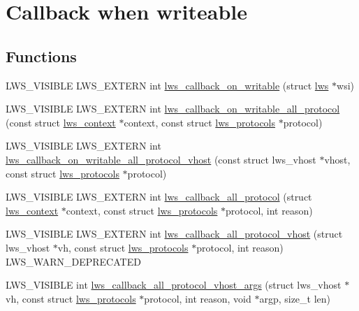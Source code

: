 \hypertarget{group__callback-when-writeable}{}\section{Callback when writeable}
\label{group__callback-when-writeable}
\subsection*{Functions}
\begin{DoxyCompactItemize}
\item 
L\+W\+S\+\_\+\+V\+I\+S\+I\+B\+LE L\+W\+S\+\_\+\+E\+X\+T\+E\+RN int \hyperlink{group__callback-when-writeable_ga941caaa468bc507b1cae52275f58800d}{lws\+\_\+callback\+\_\+on\+\_\+writable} (struct \hyperlink{structlws}{lws} $\ast$wsi)
\item 
L\+W\+S\+\_\+\+V\+I\+S\+I\+B\+LE L\+W\+S\+\_\+\+E\+X\+T\+E\+RN int \hyperlink{group__callback-when-writeable_gabbe4655c7eeb3eb1671b2323ec6b3107}{lws\+\_\+callback\+\_\+on\+\_\+writable\+\_\+all\+\_\+protocol} (const struct \hyperlink{structlws__context}{lws\+\_\+context} $\ast$context, const struct \hyperlink{structlws__protocols}{lws\+\_\+protocols} $\ast$protocol)
\item 
L\+W\+S\+\_\+\+V\+I\+S\+I\+B\+LE L\+W\+S\+\_\+\+E\+X\+T\+E\+RN int \hyperlink{group__callback-when-writeable_ga8570860e191b62db264f2bac67354ea8}{lws\+\_\+callback\+\_\+on\+\_\+writable\+\_\+all\+\_\+protocol\+\_\+vhost} (const struct lws\+\_\+vhost $\ast$vhost, const struct \hyperlink{structlws__protocols}{lws\+\_\+protocols} $\ast$protocol)
\item 
L\+W\+S\+\_\+\+V\+I\+S\+I\+B\+LE L\+W\+S\+\_\+\+E\+X\+T\+E\+RN int \hyperlink{group__callback-when-writeable_gacf04bbe089f47c971c6408c5efe2ac70}{lws\+\_\+callback\+\_\+all\+\_\+protocol} (struct \hyperlink{structlws__context}{lws\+\_\+context} $\ast$context, const struct \hyperlink{structlws__protocols}{lws\+\_\+protocols} $\ast$protocol, int reason)
\item 
L\+W\+S\+\_\+\+V\+I\+S\+I\+B\+LE L\+W\+S\+\_\+\+E\+X\+T\+E\+RN int \hyperlink{group__callback-when-writeable_ga9f893903d9de29c3de5631efad7dd9e6}{lws\+\_\+callback\+\_\+all\+\_\+protocol\+\_\+vhost} (struct lws\+\_\+vhost $\ast$vh, const struct \hyperlink{structlws__protocols}{lws\+\_\+protocols} $\ast$protocol, int reason) L\+W\+S\+\_\+\+W\+A\+R\+N\+\_\+\+D\+E\+P\+R\+E\+C\+A\+T\+ED
\item 
L\+W\+S\+\_\+\+V\+I\+S\+I\+B\+LE int \hyperlink{group__callback-when-writeable_ga0c8aa7b8173694221d59443b3516ec85}{lws\+\_\+callback\+\_\+all\+\_\+protocol\+\_\+vhost\+\_\+args} (struct lws\+\_\+vhost $\ast$vh, const struct \hyperlink{structlws__protocols}{lws\+\_\+protocols} $\ast$protocol, int reason, void $\ast$argp, size\+\_\+t len)

\end{DoxyCompactItemize}
